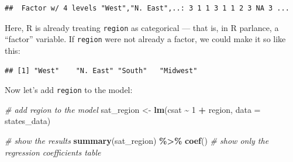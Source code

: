 \documentclass[
]{book}
\newenvironment{Shaded}{\begin{snugshade}}{\end{snugshade}}
\newcommand{\CommentTok}[1]{\textcolor[rgb]{0.56,0.35,0.01}{\textit{#1}}}
\newcommand{\DataTypeTok}[1]{\textcolor[rgb]{0.13,0.29,0.53}{#1}}
\newcommand{\DecValTok}[1]{\textcolor[rgb]{0.00,0.00,0.81}{#1}}
\newcommand{\KeywordTok}[1]{\textcolor[rgb]{0.13,0.29,0.53}{\textbf{#1}}}
\newcommand{\NormalTok}[1]{#1}
\newcommand{\OperatorTok}[1]{\textcolor[rgb]{0.81,0.36,0.00}{\textbf{#1}}}
\newcommand{\StringTok}[1]{\textcolor[rgb]{0.31,0.60,0.02}{#1}}
\begin{document}
\begin{Shaded}
\end{Shaded}

\begin{verbatim}
##  Factor w/ 4 levels "West","N. East",..: 3 1 1 3 1 1 2 3 NA 3 ...
\end{verbatim}

Here, R is already treating \texttt{region} as categorical --- that is, in R parlance, a ``factor'' variable. If \texttt{region} were not already a factor, we could make it so like this:

\begin{Shaded}
\end{Shaded}

\begin{verbatim}
## [1] "West"    "N. East" "South"   "Midwest"
\end{verbatim}

Now let's add \texttt{region} to the model:

\begin{Shaded}
\begin{Highlighting}[]
  \CommentTok{\# add region to the model}
\NormalTok{  sat\_region \textless{}{-}}\StringTok{ }\KeywordTok{lm}\NormalTok{(csat }\OperatorTok{\textasciitilde{}}\StringTok{ }\DecValTok{1} \OperatorTok{+}\StringTok{ }\NormalTok{region, }\DataTypeTok{data =}\NormalTok{ states\_data) }

  \CommentTok{\# show the results}
  \KeywordTok{summary}\NormalTok{(sat\_region) }\OperatorTok{\%\textgreater{}\%}\StringTok{ }\KeywordTok{coef}\NormalTok{() }\CommentTok{\# show only the regression coefficients table}
\end{Highlighting}
\end{Shaded}
\end{document}

